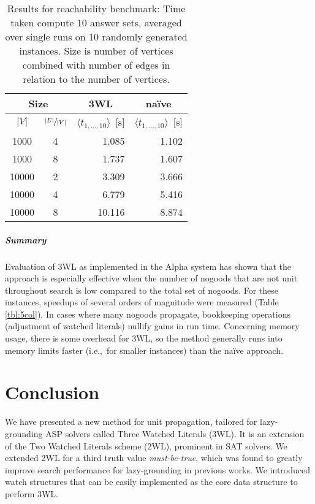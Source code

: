 \documentclass{vutinfth} %
\newcommand{\mbt}{must-be-true\xspace}
\begin{document}
\begin{table}
	\begin{center}
	\begin{tabular}{|cc||r|r|}
\hline
\multicolumn{2}{|c||}{Size} & \multicolumn{1}{c|}{3WL} & \multicolumn{1}{c|}{na\"{i}ve} \\ 
\hline
$|V|$ & $\sfrac{|E|}{|V|}$& $\langle t_{1, \ldots, 10} \rangle$~[s]& $\langle t_{1, \ldots, 10} \rangle$~[s]\\
\hline
\hline
 1000 & 4 & 	  1.085 &	  1.102 \\
 1000 & 8 & 	  1.737 &	  1.607 \\
10000 & 2 & 	  3.309 &	  3.666 \\
10000 & 4 & 	  6.779 &	  5.416 \\
10000 & 8 & 	 10.116 &	  8.874 \\
\hline
	\end{tabular}
	\end{center}
	\caption[Results for reachability benchmark]{Results for reachability benchmark: Time taken compute 10 answer sets, averaged over single runs on 10 randomly generated instances. Size is number of vertices combined with number of edges in relation to the number of vertices.}
	\label{tbl:reach}
\end{table}

\paragraph{Summary} Evaluation of 3WL as implemented in the Alpha system has shown that the approach is especially effective when the number of nogoods that are not unit throughout search is low compared to the total set of nogoods. For these instances, speedups of several orders of magnitude were measured (Table \ref{tbl:5col}). In cases where many nogoods propagate, bookkeeping operations (adjustment of watched literals) nullify gains in run time. Concerning memory usage, there is some overhead for 3WL, so the method generally runs into memory limits faster (i.e.,~for smaller instances) than the na\"{i}ve approach.

\chapter{Conclusion}
\label{chap:conc}

We have presented a new method for unit propagation, tailored for lazy-grounding ASP solvers called Three Watched Literals (3WL). It is an extension of the Two Watched Literals scheme (2WL), prominent in SAT solvers. We extended 2WL for a third truth value \emph{\mbt}, which was found to greatly improve search performance for lazy-grounding in previous works. We introduced watch structures that can be easily implemented as the core data structure to perform 3WL.
\end{document}
